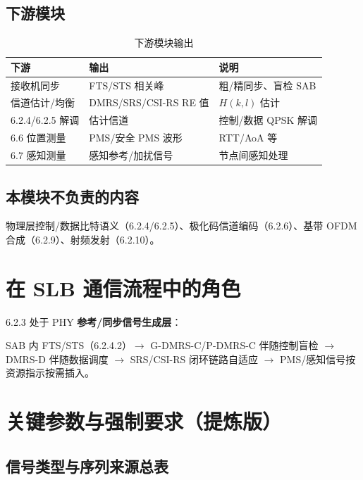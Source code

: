 \documentclass[11pt,a4paper]{ctexart}
\begin{document}
\subsection{下游模块}

\begin{longtable}{L{4cm}L{4.5cm}L{5.5cm}}
\caption{下游模块输出} \\
\toprule
\textbf{下游} & \textbf{输出} & \textbf{说明} \\
\midrule
接收机同步 & FTS/STS 相关峰 & 粗/精同步、盲检 SAB \\
信道估计/均衡 & DMRS/SRS/CSI-RS RE 值 & $H(k,l)$ 估计 \\
6.2.4/6.2.5 解调 & 估计信道 & 控制/数据 QPSK 解调 \\
6.6 位置测量 & PMS/安全 PMS 波形 & RTT/AoA 等 \\
6.7 感知测量 & 感知参考/加扰信号 & 节点间感知处理 \\
\bottomrule
\end{longtable}

\subsection{本模块不负责的内容}

物理层控制/数据比特语义（6.2.4/6.2.5）、极化码信道编码（6.2.6）、基带 OFDM 合成（6.2.9）、射频发射（6.2.10）。

\section{在 SLB 通信流程中的角色}

6.2.3 处于 PHY \textbf{参考/同步信号生成层}：

SAB 内 FTS/STS（6.2.4.2）$\rightarrow$ G-DMRS-C/P-DMRS-C 伴随控制盲检 $\rightarrow$ DMRS-D 伴随数据调度 $\rightarrow$ SRS/CSI-RS 闭环链路自适应 $\rightarrow$ PMS/感知信号按资源指示按需插入。

\section{关键参数与强制要求（提炼版）}

\subsection{信号类型与序列来源总表}
\end{document}
